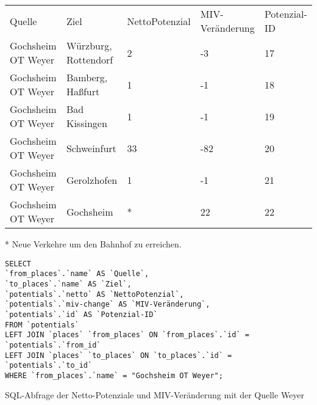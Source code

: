 \begin{tabular}{ l  l  l  l  l }
Quelle & Ziel & NettoPotenzial & MIV-Veränderung & Potenzial-ID\\ 
Gochsheim OT Weyer & Würzburg, Rottendorf & 2 & -3 & 17\\ 
Gochsheim OT Weyer & Bamberg, Haßfurt & 1 & -1 & 18\\ 
Gochsheim OT Weyer & Bad Kissingen & 1 & -1 & 19\\ 
Gochsheim OT Weyer & Schweinfurt & 33 & -82 & 20\\ 
Gochsheim OT Weyer & Gerolzhofen & 1 & -1 & 21\\ 
Gochsheim OT Weyer & Gochsheim & * & 22 & 22\\ 
\end{tabular}
\newline
\newline
* Neue Verkehre um den Bahnhof zu erreichen.
\newline
\begin{listing}[htbp]
\begin{verbatim}
SELECT
`from_places`.`name` AS `Quelle`, 
`to_places`.`name` AS `Ziel`, 
`potentials`.`netto` AS `NettoPotenzial`, 
`potentials`.`miv-change` AS `MIV-Veränderung`, 
`potentials`.`id` AS `Potenzial-ID`
FROM `potentials`
LEFT JOIN `places` `from_places` ON `from_places`.`id` = `potentials`.`from_id`
LEFT JOIN `places` `to_places` ON `to_places`.`id` = `potentials`.`to_id`
WHERE `from_places`.`name` = "Gochsheim OT Weyer";
\end{verbatim}
\caption{SQL-Abfrage der Netto-Potenziale und MIV-Veränderung mit der Quelle Weyer}\label{lst-fz-weyer}
\end{listing}